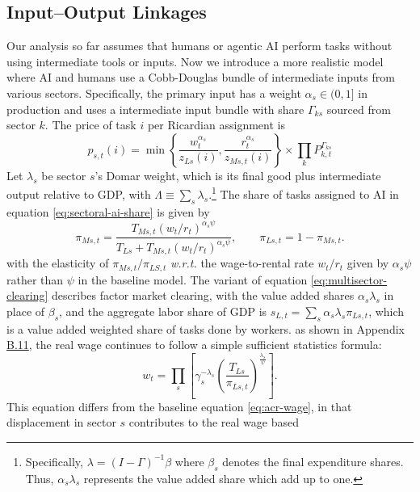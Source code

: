 \documentclass[11pt]{article}
\begin{document}
\subsection{Input--Output Linkages}\label{sec:io}

Our analysis so far assumes that humans or agentic AI perform tasks
without using intermediate tools or inputs. Now we introduce a more
realistic model where AI and humans use a Cobb-Douglas bundle of intermediate
inputs from various sectors. Specifically, the primary input has a
weight $\alpha_{s}\in(0,1]$ in production and uses a intermediate
input bundle with share $\Gamma_{ks}$ sourced from sector $k$. The
price of task $i$ per Ricardian assignment is
\[
p_{s,t}(i)=\min\left\{ \frac{w^{\alpha_{s}}_{t}}{z_{Ls}(i)},\frac{r^{\alpha_{s}}_{t}}{z_{Ms,t}(i)}\right\} \times\prod_{k}P^{\Gamma_{ks}}_{k,t}
\]
Let $\lambda_{s}$ be sector $s$'s Domar weight, which is its final
good plus intermediate output relative to GDP, with $\Lambda\equiv\sum_{s}\lambda_{s}$.\footnote{Specifically, $\lambda=(I-\Gamma)^{-1}\beta$ where $\beta_{s}$ denotes
the final expenditure shares. Thus, $\alpha_{s}\lambda_{s}$ represents
the value added share which add up to one.} The share of tasks assigned to AI in equation \eqref{eq:sectoral-ai-share}
is given by
\begin{equation}
\pi_{Ms,t}=\frac{T_{Ms,t}(w_{t}/r_{t})^{\alpha_{s}\psi}}{T_{Ls}+T_{Ms,t}(w_{t}/r_{t})^{\alpha_{s}\psi}},\qquad\pi_{Ls,t}=1-\pi_{Ms,t}.\label{eq:io-ai-share}
\end{equation}
with the elasticity of $\pi_{Ms,t}/\pi_{LS,t}$ \emph{w.r.t.} the
wage-to-rental rate $w_{t}/r_{t}$ given by $\alpha_{s}\psi$ rather
than $\psi$ in the baseline model. The variant of equation \eqref{eq:multisector-clearing}
describes factor market clearing, with the value added shares $\alpha_{s}\lambda_{s}$
in place of $\beta_{s}$, and the aggregate labor share of GDP is
$s_{L,t}=\sum_{s}\alpha_{s}\lambda_{s}\pi_{Ls,t}$, which is a value
added weighted share of tasks done by workers. as shown in Appendix
\href{https://ahmadlp.github.io/Lashkaripour_AI_Displacement_Online_Appendix.pdf\#page=61}{B.11}, the real wage continues to follow a simple
sufficient statistics formula:
\begin{equation}
w_{t}=\prod_{s}\left[\gamma^{-\lambda_{s}}_{s}\left(\frac{T_{Ls}}{\pi_{Ls,t}}\right)^{\frac{\lambda_{s}}{\psi}}\right].\label{eq:io-real-wage}
\end{equation}
This equation differs from the baseline equation \eqref{eq:acr-wage},
in that displacement in sector $s$ contributes to the real wage based
\end{document}
